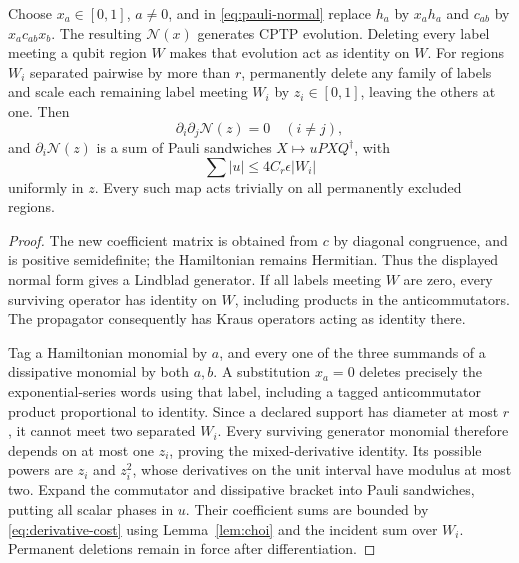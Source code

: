 \begin{lemma}\label{lem:label-interpolation}
Choose \(x_a\in[0,1]\), \(a\ne0\), and in \eqref{eq:pauli-normal}
replace \(h_a\) by \(x_ah_a\) and \(c_{ab}\) by \(x_ac_{ab}x_b\).
The resulting \(\mathcal N(x)\) generates CPTP evolution.
Deleting every label meeting a qubit region \(W\) makes that
evolution act as identity on \(W\).
For regions \(W_i\) separated pairwise by more than \(r\),
permanently delete any family of labels and scale each remaining
label meeting \(W_i\) by \(z_i\in[0,1]\), leaving the others at one.
Then
\[
 \partial_i\partial_j\mathcal N(z)=0\quad(i\ne j),
\]
and \(\partial_i\mathcal N(z)\) is a sum of Pauli sandwiches
\(X\mapsto uPXQ^\dagger\), with
\begin{equation}\label{eq:derivative-cost}
 \sum |u|\le4C_r\epsilon |W_i|
\end{equation}
uniformly in \(z\). Every such map acts trivially on all permanently
excluded regions.
\end{lemma}
\begin{proof}
The new coefficient matrix is obtained from \(c\) by diagonal
congruence, and is positive semidefinite; the Hamiltonian remains
Hermitian. Thus the displayed normal form gives a Lindblad
generator. If all labels meeting \(W\) are zero, every surviving
operator has identity on \(W\), including products in the
anticommutators. The propagator consequently has Kraus operators
acting as identity there.

Tag a Hamiltonian monomial by \(a\), and every one of the three
summands of a dissipative monomial by both \(a,b\).
A substitution \(x_a=0\) deletes precisely the exponential-series
words using that label, including a tagged anticommutator product
proportional to identity. Since a declared support has diameter
at most \(r\), it cannot meet two separated \(W_i\).
Every surviving generator monomial therefore depends on at most
one \(z_i\), proving the mixed-derivative identity.
Its possible powers are \(z_i\) and \(z_i^2\), whose derivatives
on the unit interval have modulus at most two.
Expand the commutator and dissipative bracket into Pauli
sandwiches, putting all scalar phases in \(u\).
Their coefficient sums are bounded by
\eqref{eq:derivative-cost} using Lemma~\ref{lem:choi} and the
incident sum over \(W_i\).
Permanent deletions remain in force after differentiation.
\end{proof}


